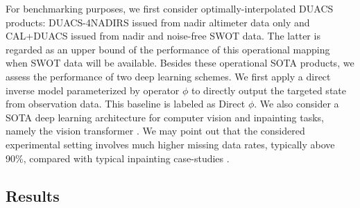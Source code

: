 \documentclass{article}
\begin{document}

For benchmarking purposes, we first consider  optimally-interpolated DUACS products: DUACS-4NADIRS issued
 from nadir altimeter data only and CAL+DUACS issued from nadir and noise-free SWOT data. The latter is regarded as an upper bound of the performance of this operational mapping when SWOT data will be available. Besides these operational SOTA products, we assess the performance of two deep learning schemes. 
We first apply a direct inverse model parameterized by  operator $\phi$ to directly output the targeted state from observation data. This baseline is labeled as Direct $\phi$. We also consider a SOTA deep learning architecture for computer vision and inpainting tasks, namely the vision transformer \cite{vit}\cite{inpaintingattn}. We may point out that the considered experimental setting involves much higher missing data rates, typically above 90\%, compared with typical inpainting case-studies \cite{inpaintingattn}.


\subsection{Results}
\end{document}
